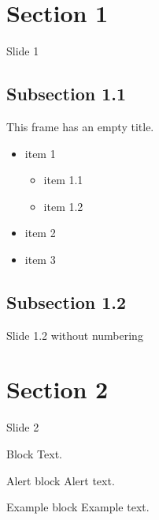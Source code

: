 \documentclass[usenames,dvipsnames]{beamer}
\begin{document}
    
    \section{Section 1}
    \begin{frame}[plain]{}
        \sectionpage
    \end{frame}
    
    
    \begin{frame}{Slide 1}
        \lipsum[1]
    \end{frame}
    
    
    \subsection{Subsection 1.1}
    \begin{frame}[plain]{}
        \subsectionpage
    \end{frame}
    \begin{frame}
        This frame has an empty title.
        \vfill
        \begin{itemize}
            \item item 1
            \begin{itemize}
                \item item 1.1
                \item item 1.2
            \end{itemize}
            \item item 2
            \item item 3
        \end{itemize}
    \end{frame}
    
    
    \subsection{Subsection 1.2}
    \begin{frame}[nonumber]{Slide 1.2 without numbering}
        \lipsum[2]
    \end{frame}
    
    
    \section[Short]{Section 2}
    \begin{frame}{Slide 2}
        \begin{block}{Block}
            Text.
        \end{block}
        \pause
        \begin{alertblock}{Alert block}
            Alert \alert{text}.
        \end{alertblock}
        \pause
        \begin{exampleblock}{Example block}
            Example \textcolor{greenPolimi}{text}.
        \end{exampleblock}
    \end{frame}
\end{document}
